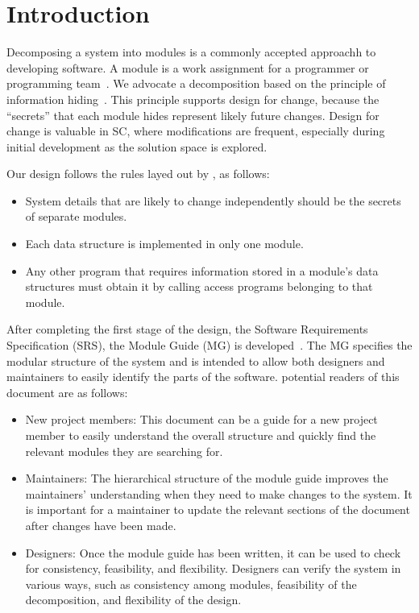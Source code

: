 \documentclass[12pt, titlepage]{article}
\begin{document}
\newpage

\tableofcontents

\listoftables

\listoffigures

\newpage


\section{Introduction}

Decomposing a system into modules is a commonly accepted approachh to developing
software.  A module is a work assignment for a programmer or programming
team~\citep{ParnasEtAl1984}.  We advocate a decomposition
based on the principle of information hiding~\citep{Parnas1972a}.  This
principle supports design for change, because the ``secrets'' that each module
hides represent likely future changes.  Design for change is valuable in SC,
where modifications are frequent, especially during initial development as the
solution space is explored.  

Our design follows the rules layed out by \citet{ParnasEtAl1984}, as follows:
\begin{itemize}
\item System details that are likely to change independently should be the
  secrets of separate modules.
\item Each data structure is implemented in only one module.
\item Any other program that requires information stored in a module's data
  structures must obtain it by calling access programs belonging to that module.
\end{itemize}

After completing the first stage of the design, the Software Requirements
Specification (SRS), the Module Guide (MG) is developed~\citep{ParnasEtAl1984}. The MG
specifies the modular structure of the system and is intended to allow both
designers and maintainers to easily identify the parts of the software.
potential readers of this document are as follows:

\begin{itemize}
\item New project members: This document can be a guide for a new project member
  to easily understand the overall structure and quickly find the
  relevant modules they are searching for.
\item Maintainers: The hierarchical structure of the module guide improves the
  maintainers' understanding when they need to make changes to the system. It is
  important for a maintainer to update the relevant sections of the document
  after changes have been made.
\item Designers: Once the module guide has been written, it can be used to
  check for consistency, feasibility, and flexibility. Designers can verify the
  system in various ways, such as consistency among modules, feasibility of the
  decomposition, and flexibility of the design.
\end{itemize}
\end{document}
